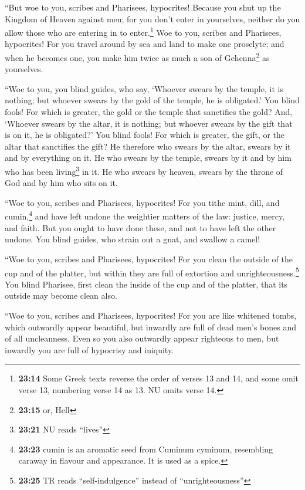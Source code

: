 ``But woe to you, scribes and Pharisees, hypocrites!
Because you shut up the Kingdom of Heaven against men; for you don't
enter in yourselves, neither do you allow those who are entering in to
enter.\footnote{\textbf{23:14} Some Greek texts reverse the order of
  verses 13 and 14, and some omit verse 13, numbering verse 14 as 13. NU
  omits verse 14.}  Woe to you, scribes and Pharisees,
hypocrites! For you travel around by sea and land to make one proselyte;
and when he becomes one, you make him twice as much a son of
Gehenna\footnote{\textbf{23:15} or, Hell} as yourselves.

 ``Woe to you, you blind guides, who say, `Whoever swears
by the temple, it is nothing; but whoever swears by the gold of the
temple, he is obligated.'  You blind fools! For which is
greater, the gold or the temple that sanctifies the gold?
 And, `Whoever swears by the altar, it is nothing; but
whoever swears by the gift that is on it, he is obligated?'
 You blind fools! For which is greater, the gift, or the
altar that sanctifies the gift?  He therefore who swears
by the altar, swears by it and by everything on it.  He
who swears by the temple, swears by it and by him who has been
living\footnote{\textbf{23:21} NU reads ``lives''} in it.
 He who swears by heaven, swears by the throne of God and
by him who sits on it.

 ``Woe to you, scribes and Pharisees, hypocrites! For you
tithe mint, dill, and cumin,\footnote{\textbf{23:23} cumin is an
  aromatic seed from Cuminum cyminum, resembling caraway in flavour and
  appearance. It is used as a spice.} and have left undone the weightier
matters of the law: justice, mercy, and faith. But you ought to have
done these, and not to have left the other undone.  You
blind guides, who strain out a gnat, and swallow a camel!

 ``Woe to you, scribes and Pharisees, hypocrites! For you
clean the outside of the cup and of the platter, but within they are
full of extortion and unrighteousness.\footnote{\textbf{23:25} TR reads
  ``self-indulgence'' instead of ``unrighteousness''} 
You blind Pharisee, first clean the inside of the cup and of the
platter, that its outside may become clean also.

 ``Woe to you, scribes and Pharisees, hypocrites! For you
are like whitened tombs, which outwardly appear beautiful, but inwardly
are full of dead men's bones and of all uncleanness. 
Even so you also outwardly appear righteous to men, but inwardly you are
full of hypocrisy and iniquity.

